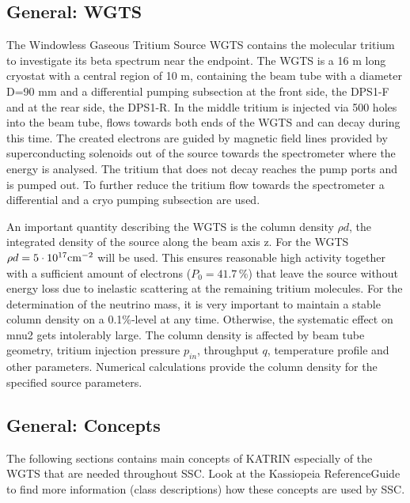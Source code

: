 \subsection{General: WGTS}\label{_s_s_cmain_summaryWGTS}
The Windowless Gaseous Tritium Source WGTS contains the molecular tritium to investigate its beta spectrum near the endpoint. The WGTS is a 16 m long cryostat with a central region of 10 m, containing the beam tube with a diameter D=90 mm and a differential pumping subsection at the front side, the DPS1-F and at the rear side, the DPS1-R. In the middle tritium is injected via 500 holes into the beam tube, flows towards both ends of the WGTS and can decay during this time. The created electrons are guided by magnetic field lines provided by superconducting solenoids out of the source towards the spectrometer where the energy is analysed. The tritium that does not decay reaches the pump ports and is pumped out. To further reduce the tritium flow towards the spectrometer a differential and a cryo pumping subsection are used.

An important quantity describing the WGTS is the column density $\rho d$, the integrated density of the source along the beam axis z. For the WGTS $\rho d = 5\cdot 10^{17} \rm{cm}^{-2} $ will be used. This ensures reasonable high activity together with a sufficient amount of electrons ($ P_0 = 41.7\,\%$) that leave the source without energy loss due to inelastic scattering at the remaining tritium molecules. For the determination of the neutrino mass, it is very important to maintain a stable column density on a 0.1\%-\/level at any time. Otherwise, the systematic effect on mnu2 gets intolerably large. The column density is affected by beam tube geometry, tritium injection pressure $p_{in}$, throughput $q$, temperature profile and other parameters. Numerical calculations provide the column density for the specified source parameters.

\subsection{General: Concepts}\label{_s_s_cmain_generalConcepts}
The following sections contains main concepts of KATRIN especially of the WGTS that are needed throughout SSC. Look at the Kassiopeia ReferenceGuide to find more information (class descriptions) how these concepts are used by SSC.
